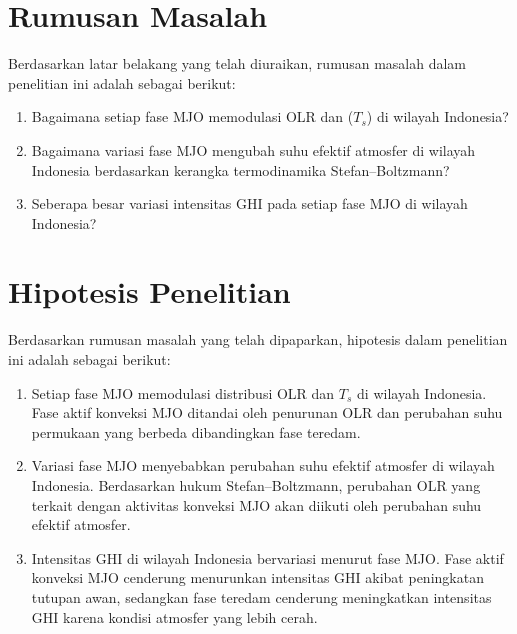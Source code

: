 \documentclass[12pt,a4paper]{report}
\begin{document}
\section{Rumusan Masalah}
Berdasarkan latar belakang yang telah diuraikan, rumusan masalah 
dalam penelitian ini adalah sebagai berikut:
\begin{enumerate}
    \item Bagaimana setiap fase MJO memodulasi OLR dan ($T_s$) di wilayah Indonesia?

    \item Bagaimana variasi fase MJO mengubah suhu efektif atmosfer di wilayah Indonesia berdasarkan kerangka termodinamika Stefan--Boltzmann?

    \item Seberapa besar variasi intensitas GHI pada setiap fase MJO di wilayah Indonesia?
\end{enumerate}

\section{Hipotesis Penelitian}
Berdasarkan rumusan masalah yang telah dipaparkan, hipotesis dalam penelitian ini adalah sebagai berikut:
\begin{enumerate}
    \item Setiap fase MJO memodulasi distribusi OLR dan $T_s$ di wilayah Indonesia. Fase aktif konveksi MJO ditandai oleh penurunan OLR dan perubahan suhu permukaan yang berbeda dibandingkan fase teredam.

    \item Variasi fase MJO menyebabkan perubahan suhu efektif atmosfer di wilayah Indonesia. Berdasarkan hukum Stefan--Boltzmann, perubahan OLR yang terkait dengan aktivitas konveksi MJO akan diikuti oleh perubahan suhu efektif atmosfer.

    \item Intensitas GHI di wilayah Indonesia bervariasi menurut fase MJO. Fase aktif konveksi MJO cenderung menurunkan intensitas GHI akibat peningkatan tutupan awan, sedangkan fase teredam cenderung meningkatkan intensitas GHI karena kondisi atmosfer yang lebih cerah.
\end{enumerate}
\end{document}

